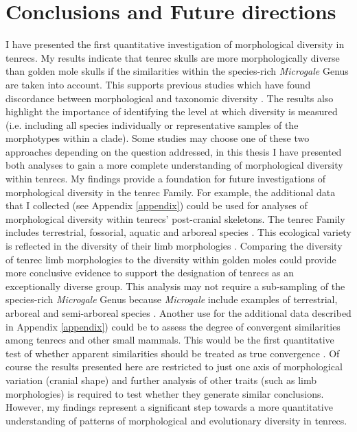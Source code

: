 \section{Conclusions and Future directions}
\label{sect:concl}

	I have presented the first quantitative investigation of morphological diversity in tenrecs. My results indicate that tenrec skulls are more morphologically diverse than golden mole skulls if the similarities within the species-rich \textit{Microgale} Genus are taken into account. This supports previous studies which have found discordance between morphological and taxonomic diversity \citep[e.g.][]{Ruta2013, Hopkins2013}. The results also highlight the importance of identifying the level at which diversity is measured (i.e. including all species individually or representative samples of the morphotypes within a clade). Some studies may choose one of these two approaches depending on the question addressed, in this thesis I have presented both analyses to gain a more complete understanding of morphological diversity within tenrecs. My findings provide a foundation for future investigations of morphological diversity in the tenrec Family. 
	For example, the additional data that I collected (see Appendix \ref{appendix}) could be used for analyses of morphological diversity within tenrecs' post-cranial skeletons. The tenrec Family includes terrestrial, fossorial, aquatic and arboreal species \citep{Olson2013, Soarimalala2011}. This ecological variety is reflected in the diversity of their limb morphologies \citep{Salton2009, Salton2004}. Comparing the diversity of tenrec limb morphologies to the diversity within golden moles could provide more conclusive evidence to support the designation of tenrecs as an exceptionally diverse group. This analysis may not require a sub-sampling of the species-rich \textit{Microgale} Genus because \textit{Microgale} include examples of terrestrial, arboreal and semi-arboreal species \citep{Soarimalala2011}.	
	Another use for the additional data described in Appendix \ref{appendix}) could be to assess the degree of convergent similarities among tenrecs and other small mammals. This would be the first quantitative test of whether apparent similarities \citep{Olson2013, Soarimalala2011, Eisenberg1969} should be treated as true convergence \citep[e.g.][]{Losos2011, Stayton2008}.
	Of course the results presented here are restricted to just one axis of morphological variation (cranial shape) and further analysis of other traits (such as limb morphologies) is required to test whether they generate similar conclusions. However, my findings represent a significant step towards a more quantitative understanding of patterns of morphological and evolutionary diversity in tenrecs. 


